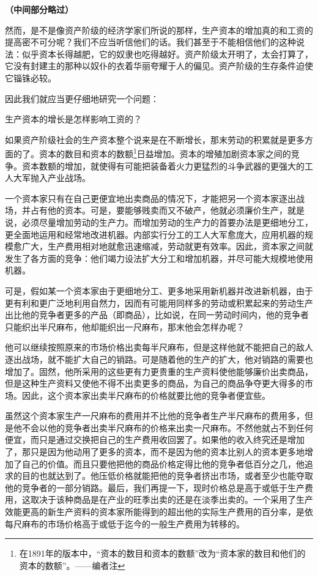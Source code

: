 \documentclass[a4paper,twoside,12pt,AutoFakeBold]{ctexart}
\begin{document}
\textbf{（中间部分略过）} 

然而，是不是像资产阶级的经济学家们所说的那样，生产资本的增加真的和工资的提高密不可分呢？我们不应当听信他们的话。我们甚至于不能相信他们的这种说法：似乎资本长得越肥，它的奴隶也吃得越好。资产阶级太开明了，太会打算了，它没有封建主的那种以奴仆的衣着华丽夸耀于人的偏见。资产阶级的生存条件迫使它锱铢必较。

因此我们就应当更仔细地研究一个问题：

生产资本的增长是怎样影响工资的？

如果资产阶级社会的生产资本整个说来是在不断增长，那末劳动的积累就是更多方面的了。资本的数目和资本的数额\footnote{在1891年的版本中，“资本的数目和资本的数额”改为“资本家的数目和他们的资本的数额”。——编者注}日益增加。资本的增殖加剧资本家之间的竞争。资本数额的增加，就使得有可能把装备着火力更猛烈的斗争武器的更强大的工人大军抛入产业战场。

一个资本家只有在自己更便宜地出卖商品的情况下，才能把另一个资本家逐出战场，并占有他的资本。可是，要能够贱卖而又不破产，他就必须廉价生产，就是说，必须尽量增加劳动的生产力。而增加劳动的生产力的首要办法是更细地分工，更全面地运用和经常地改进机器。内部实行分工的工人大军愈庞大，应用机器的规模愈广大，生产费用相对地就愈迅速缩减，劳动就更有效率。因此，资本家之间就发生了各方面的竞争：他们竭力设法扩大分工和增加机器，并尽可能大规模地使用机器。

可是，假如某一个资本家由于更细地分工、更多地采用新机器并改进新机器，由于更有利和更广泛地利用自然力，因而有可能用同样多的劳动或积累起来的劳动生产出比他的竞争者更多的产品（即商品），比如说，在同一劳动时间内，他的竞争者只能织出半尺麻布，他却能织出一尺麻布，那末他会怎样办呢？

他可以继续按照原来的市场价格出卖每半尺麻布，但是这样他就不能把自己的敌人逐出战场，就不能扩大自己的销路。可是随着他的生产的扩大，他对销路的需要也增加了。固然，他所采用的这些更有力更贵重的生产资料使他能够廉价出卖商品，但是这种生产资料又使他不得不出卖更多的商品，为自己的商品争夺更大得多的市场。因此，这个资本家出卖半尺麻布的价格就要比他的竞争者便宜些。

虽然这个资本家生产一尺麻布的费用并不比他的竞争者生产半尺麻布的费用多，但是他不会以他的竞争者出卖半尺麻布的价格来出卖一尺麻布。不然他就占不到任何便宜，而只是通过交换把自己的生产费用收回罢了。如果他的收入终究还是增加了，那只是因为他动用了更多的资本，而不是因为他的资本比别人的资本更多地增加了自己的价值。而且只要他把他的商品价格定得比他的竞争者低百分之几，他追求的目的也就达到了。他压低价格就能把他的竞争者挤出市场，或者至少也能夺取他的竞争者的一部分销路。最后，我们再提一下，现时价格总是高于或低于生产费用，这取决于该种商品是在产业的旺季出卖的还是在淡季出卖的。一个采用了生产效能更高的新生产资料的资本家所能得到的超出他的实际生产费用的百分率，是依每尺麻布的市场价格高于或低于迄今的一般生产费用为转移的。
\end{document}
